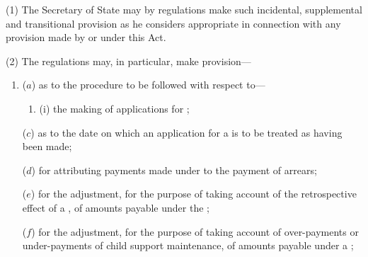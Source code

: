 \documentclass[a4paper]{article}
\begin{document}
(1) The Secretary of State may by regulations make such incidental, supplemental and transitional provision as he considers appropriate in connection with any provision made by or under this Act.

(2)
The regulations may, in particular, make provision---
\begin{enumerate}\item[]
($a$)
as to the procedure to be followed with respect to---
\begin{enumerate}\item[]
(i)
the making of applications for ;


\end{enumerate}



($c$) as to the date on which an application for a  is to be treated as having been made;

($d$) for attributing payments made under  to the payment of arrears;

($e$) for the adjustment, for the purpose of taking account of the retrospective
effect of a , of amounts
payable under the ;

($f$) for the adjustment, for the purpose of taking account of over-payments or
under-payments of child support maintenance, of amounts payable under
a ;


\end{enumerate}
\end{document}
